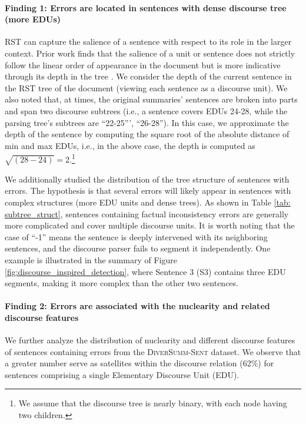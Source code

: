 \paragraph{Finding 1:  Errors are located in sentences with dense  discourse tree (more EDUs)}
RST can capture the salience of a
sentence with respect to its role in the larger context. Prior work finds that the salience of a unit or sentence does not strictly follow the linear order of appearance in the document but is more indicative through its depth in the tree \cite{Zhong_Jiang_Xu_Li_2020}. We consider the depth of the current sentence in
the RST tree of the document (viewing each sentence as a
discourse unit). We also noted that, at times, the original summaries' sentences are broken into parts and span two discourse subtrees (i.e., a sentence covers EDUs 24-28, while the parsing tree's subtrees are ``22-25''', ``26-28''). In this case, we approximate the depth of the sentence by computing the square root of the absolute distance of min and max EDUs, i.e., in the above case, the depth is computed as $\sqrt{(28-24)}=2$.\footnote{We assume that the discourse tree is nearly binary, with each node having two children.}

We additionally studied the distribution of the tree structure of sentences with errors. The hypothesis is that several errors will likely appear in sentences with complex structures (more EDU units and dense trees). As shown in Table \ref{tab: subtree_struct}, sentences containing factual inconsistency errors are generally more complicated and cover multiple discourse units. It is worth noting that the case of ``-1'' means the sentence is deeply intervened with its neighboring sentences, and the discourse parser fails to segment it independently. One example is illustrated in the summary of Figure \ref{fig:discourse_inspired_detection}, where Sentence 3 (S3) contains three EDU segments, making it more complex than the other two sentences.

\paragraph{Finding 2: Errors are associated with the nuclearity and related discourse features}
We further analyze the distribution of nuclearity and different discourse features of sentences containing errors from the \textsc{DiverSumm-Sent} dataset. We observe that a greater number serve as satellites within the discourse relation (62\%) for sentences comprising a single Elementary Discourse Unit (EDU). 

